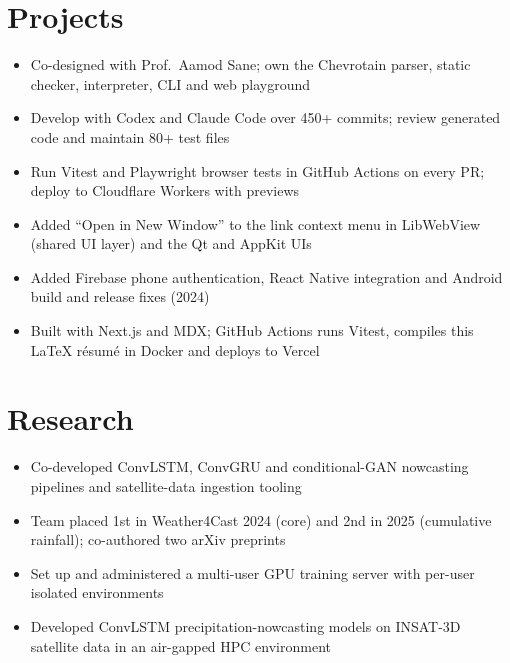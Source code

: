 \section{Projects}
\begin{itemize}
  \item Co-designed with Prof.\ Aamod Sane; own the Chevrotain parser, static checker, interpreter, CLI and web playground
  \item Develop with Codex and Claude Code over 450+ commits; review generated code and maintain 80+ test files
  \item Run Vitest and Playwright browser tests in GitHub Actions on every PR; deploy to Cloudflare Workers with previews
\end{itemize}
\begin{itemize}
  \item Added ``Open in New Window'' to the link context menu in LibWebView (shared UI layer) and the Qt and AppKit UIs
\end{itemize}
\begin{itemize}
  \item Added Firebase phone authentication, React Native integration and Android build and release fixes (2024)
\end{itemize}
\begin{itemize}
  \item Built with Next.js and MDX; GitHub Actions runs Vitest, compiles this LaTeX résumé in Docker and deploys to Vercel
\end{itemize}
\section{Research}
\begin{itemize}
  \item Co-developed ConvLSTM, ConvGRU and conditional-GAN nowcasting pipelines and satellite-data ingestion tooling
  \item Team placed 1st in Weather4Cast 2024 (core) and 2nd in 2025 (cumulative rainfall); co-authored two arXiv preprints
  \item Set up and administered a multi-user GPU training server with per-user isolated environments
\end{itemize}
\begin{itemize}
  \item Developed ConvLSTM precipitation-nowcasting models on INSAT-3D satellite data in an air-gapped HPC environment
\end{itemize}
